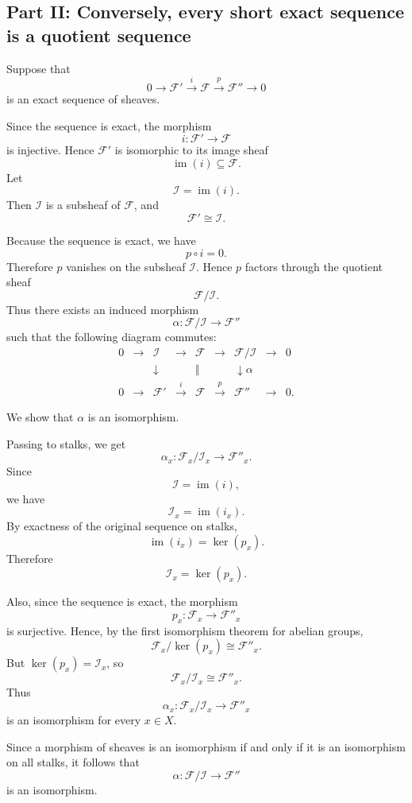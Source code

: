 \documentclass[12pt,a4paper]{article}
\DeclareMathOperator{\im}{im}
\newcommand{\F}{\mathcal F}
\theoremstyle{notespace}
\newcommand{\Fp}{\mathcal F'}      %
\newcommand{\Fpp}{\mathcal F''}
\begin{document}
\subsection{Part II: Conversely, every short exact sequence is a quotient sequence}

Suppose that
\[
0\longrightarrow \Fp
\xrightarrow{i}
\F
\xrightarrow{p}
\Fpp
\longrightarrow 0
\]
is an exact sequence of sheaves.

Since the sequence is exact, the morphism
\[
i:\Fp\longrightarrow \F
\]
is injective. Hence \(\Fp\) is isomorphic to its image sheaf
\[
\im(i)\subseteq \F.
\]
Let
\[
\mathcal I=\im(i).
\]
Then \(\mathcal I\) is a subsheaf of \(\F\), and
\[
\Fp\cong \mathcal I.
\]

Because the sequence is exact, we have
\[
p\circ i=0.
\]
Therefore \(p\) vanishes on the subsheaf \(\mathcal I\). Hence \(p\) factors through the quotient sheaf
\[
\F/\mathcal I.
\]
Thus there exists an induced morphism
\[
\alpha:\F/\mathcal I\longrightarrow \Fpp
\]
such that the following diagram commutes:
\[
\begin{array}{ccccccccc}
	0 & \longrightarrow & \mathcal I & \longrightarrow & \F & \longrightarrow & \F/\mathcal I & \longrightarrow & 0 \\
	&                 & \downarrow  &               & \Vert &                 & \downarrow \alpha &                 &   \\
	0 & \longrightarrow & \Fp & \xrightarrow{i} & \F & \xrightarrow{p} & \Fpp & \longrightarrow & 0.
\end{array}
\]

We show that \(\alpha\) is an isomorphism.

Passing to stalks, we get
\[
\alpha_x:\F_x/\mathcal I_x\longrightarrow \Fpp_x.
\]
Since
\[
\mathcal I=\im(i),
\]
we have
\[
\mathcal I_x=\im(i_x).
\]
By exactness of the original sequence on stalks,
\[
\im(i_x)=\ker(p_x).
\]
Therefore
\[
\mathcal I_x=\ker(p_x).
\]

Also, since the sequence is exact, the morphism
\[
p_x:\F_x\longrightarrow \Fpp_x
\]
is surjective. Hence, by the first isomorphism theorem for abelian groups,
\[
\F_x/\ker(p_x)\cong \Fpp_x.
\]
But \(\ker(p_x)=\mathcal I_x\), so
\[
\F_x/\mathcal I_x\cong \Fpp_x.
\]
Thus
\[
\alpha_x:\F_x/\mathcal I_x\longrightarrow \Fpp_x
\]
is an isomorphism for every \(x\in X\).

Since a morphism of sheaves is an isomorphism if and only if it is an isomorphism on all stalks, it follows that
\[
\alpha:\F/\mathcal I\longrightarrow \Fpp
\]
is an isomorphism.
\end{document}
